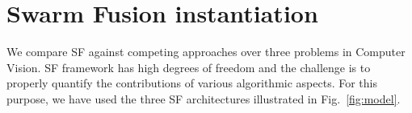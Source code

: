 \section{Swarm Fusion instantiation}
We compare SF against competing approaches over three problems in
Computer Vision. SF framework has high degrees of freedom and the
challenge is to properly quantify the contributions of various
algorithmic aspects. For this purpose, we have used the three SF
architectures illustrated in Fig.~\ref{fig:model}.




